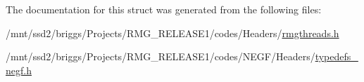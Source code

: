 The documentation for this struct was generated from the following files\-:\begin{DoxyCompactItemize}
\item 
/mnt/ssd2/briggs/\-Projects/\-R\-M\-G\-\_\-\-R\-E\-L\-E\-A\-S\-E1/codes/\-Headers/\hyperlink{rmgthreads_8h}{rmgthreads.\-h}\item 
/mnt/ssd2/briggs/\-Projects/\-R\-M\-G\-\_\-\-R\-E\-L\-E\-A\-S\-E1/codes/\-N\-E\-G\-F/\-Headers/\hyperlink{typedefs__negf_8h}{typedefs\-\_\-negf.\-h}\end{DoxyCompactItemize}
